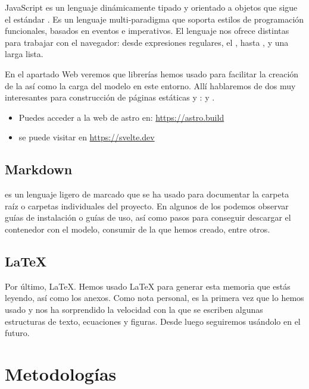 JavaScript es un lenguaje dinámicamente tipado y orientado a objetos que sigue el estándar . Es un lenguaje multi-paradigma que soporta estilos de programación funcionales, basados en eventos e imperativos. El lenguaje nos ofrece distintas  para trabajar con el navegador: desde expresiones regulares, el , hasta , y una larga lista.

En el apartado Web veremos que librerías hemos usado para facilitar la creación de la  así como la carga del modelo en este entorno. Allí hablaremos de dos  muy interesantes para construcción de páginas estáticas y :  y .

\begin{itemize}
  \item Puedes acceder a la web de astro en: \url{https://astro.build}
  \item {} se puede visitar en \url{https://svelte.dev}
\end{itemize}

\subsection{Markdown}

 es un lenguaje ligero de marcado que se ha usado para documentar la carpeta raíz o carpetas individuales del proyecto. En algunos de los  podemos observar guías de instalación o guías de uso, así como pasos para conseguir descargar el contenedor con el modelo, consumir de la  que hemos creado, entre otros.

\subsection{\LaTeX}

Por último, LaTeX. Hemos usado LaTeX para generar esta memoria que estás leyendo, así como los anexos. Como nota personal, es la primera vez que lo hemos usado y nos ha sorprendido la velocidad con la que se escriben algunas estructuras de texto, ecuaciones y figuras. Desde luego seguiremos usándolo en el futuro.


\section{Metodologías}

